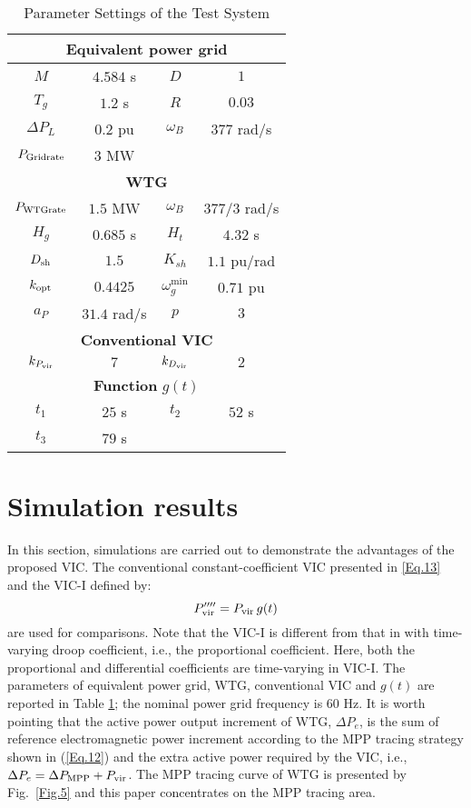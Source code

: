 \documentclass[journal]{IEEEtran}
\begin{document}
\begin{table}[h]
	\centering
	\caption{Parameter Settings of the Test System}
	\label{Table.I}
	\begin{tabular}{cc|cc}
		\hline
		\multicolumn{4}{c}{\textbf{Equivalent power grid}} \\ \hline
		$M$ & $4.584$ s & $D$ & $1$ \\
		$T_g$ & $1.2$ s & $R$ & $0.03$ \\
		$\Delta P_L$ & $0.2$ pu & $\omega_B$ & $377$ rad/s \\
		$P_{\rm Gridrate}$ & $3$ MW \\
		\hline \hline
		\multicolumn{4}{c}{\textbf{WTG}}\\ \hline
		$P_{\rm WTGrate}$ & $1.5$ MW & $\omega_B$ & $377/3$ rad/s \\
		$H_g$ & $0.685$ s & $H_t$ & $4.32$ s \\
		$D_{\rm sh}$ & $1.5$ & $K_{sh}$ & $1.1$ pu/rad \\
		$k_{\rm opt}$ & $0.4425$ & $\omega^{\min}_g$ & $0.71$ pu \\
		$a_P$ & $31.4$ rad/s & $p$ & $3$ \\
		\hline \hline
		\multicolumn{4}{c}{\textbf{Conventional VIC}} \\ \hline
		$k_{P_{\rm vir}}$ & $7$ & $k_{D_{\rm vir}}$ & $2$ \\ \hline \hline
		\multicolumn{4}{c}{\textbf{Function} $g(t)$} \\ \hline
		$t_1$ & $25$ s & $t_2$ & $52$ s \\
		$t_3$ & $79$ s \\ \hline
	\end{tabular} 
\end{table}

\section{Simulation results}
In this section, simulations are carried out to demonstrate the advantages of the proposed VIC. The conventional constant-coefficient VIC presented in \eqref{Eq.13} and the VIC-I defined by:
\begin{equation}
  P''''_{\rm vir}= P_{\rm vir} \, g(t)
  \label{Eq.30}
\end{equation}
are used for comparisons. Note that the VIC-I is different from that in \cite{Garmroodi2017Frequency} with time-varying droop coefficient, i.e., the proportional coefficient. Here, both the proportional and differential coefficients are time-varying in VIC-I. The parameters of equivalent power grid, WTG, conventional VIC and $g(t)$ are reported in Table \ref{Table.I}; the nominal power grid frequency is 60 Hz. It is worth pointing that the active power output increment of WTG, $\Delta P_e$, is the sum of reference electromagnetic power increment according to the MPP tracing strategy shown in (\ref{Eq.12}) and the extra active power required by the VIC, i.e., $\Delta P_e=\Delta P_{\rm MPP}+P_{\rm vir}$. The MPP tracing curve of WTG is presented by Fig.~\ref{Fig.5} and this paper concentrates on the MPP tracing area.
\end{document}
